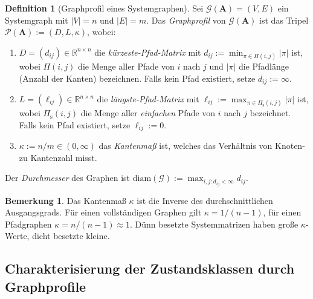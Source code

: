 \documentclass[a4paper, 12pt, twoside, openright]{report}
\theoremstyle{definition}
\newtheorem{definition}[theorem]{Definition}
\newtheorem{remark}[theorem]{Bemerkung}
\theoremstyle{definition}
\newcommand{\R}{\mathbb{R}}
\newcommand{\vA}{\bm{A}}
\begin{document}
\begin{definition}[Graphprofil eines Systemgraphen]
\label{def:graphprofil}
Sei $\mathcal{G}(\vA) = (V, E)$ ein Systemgraph mit $|V| = n$ und $|E| = m$.
Das \emph{Graphprofil} von $\mathcal{G}(\vA)$ ist das Tripel
$\mathcal{P}(\vA) := (D, L, \kappa)$, wobei:
\begin{enumerate}[label=(\roman*)]
  \item $D = (d_{ij}) \in \R^{n \times n}$ die \emph{kürzeste-Pfad-Matrix} mit
    $d_{ij} := \min_{\pi \in \Pi(i,j)} |\pi|$ ist, wobei $\Pi(i,j)$ die Menge aller
    Pfade von $i$ nach $j$ und $|\pi|$ die Pfadlänge (Anzahl der Kanten) bezeichnen.
    Falls kein Pfad existiert, setze $d_{ij} := \infty$.
  \item $L = (\ell_{ij}) \in \R^{n \times n}$ die \emph{längste-Pfad-Matrix} mit
    $\ell_{ij} := \max_{\pi \in \Pi_{\mathrm{s}}(i,j)} |\pi|$ ist, wobei
    $\Pi_{\mathrm{s}}(i,j)$ die Menge aller \emph{einfachen} Pfade von $i$ nach $j$
    bezeichnet. Falls kein Pfad existiert, setze $\ell_{ij} := 0$.
  \item $\kappa := n / m \in (0, \infty)$ das \emph{Kantenmaß} ist, welches das
    Verhältnis von Knoten- zu Kantenzahl misst.
\end{enumerate}
Der \emph{Durchmesser} des Graphen ist $\mathrm{diam}(\mathcal{G}) :=
\max_{i,j : d_{ij}<\infty} d_{ij}$.
\end{definition}

\begin{remark}
Das Kantenmaß $\kappa$ ist die Inverse des durchschnittlichen Ausgangsgrads.
Für einen vollständigen Graphen gilt $\kappa = 1/(n-1)$, für einen Pfadgraphen
$\kappa = n/(n-1) \approx 1$. Dünn besetzte Systemmatrizen haben große $\kappa$-Werte,
dicht besetzte kleine.
\end{remark}

\subsection{Charakterisierung der Zustandsklassen durch Graphprofile}
\end{document}
